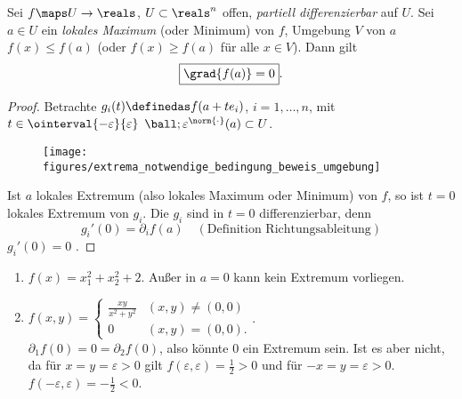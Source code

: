 \begin{satz}\label{extremum_notwendige_bedingung}
    Sei \( f\maps U\to \reals \), \( U\subset \reals^n \) offen, \emph{partiell differenzierbar} auf \( U \). Sei \( a\in U \) ein \emph{lokales Maximum} (oder Minimum) von \( f \), \dh  \texists Umgebung \( V \) von \( a \) \sd \( f(x)\leq f(a) \) (oder \( f(x)\geq f(a) \) für alle \( x\in V \)). Dann gilt
    \begin{equation*}
        \boxed{\grad{f(a)}=0}.
    \end{equation*} 
\end{satz}
\begin{proof}
    Betrachte \( g_i(t)\definedas f(a+t e_i) \), \( i=1,\dotsc, n \), mit \( t\in \ointerval{-\varepsilon}{\varepsilon} \) \sd \( \ball;{\varepsilon}^{\norm{\cdot}}(a)\subset U \).
    \begin{figure}[H]
        \centering
        \texttt{[image: figures/extrema\_notwendige\_bedingung\_beweis\_umgebung]}
        \label{fig:extrema_notwendige_bedingung_beweis_umgebung}
    \end{figure}
    Ist \( a \) lokales Extremum (also lokales Maximum oder Minimum) von \( f\), so ist \( t=0 \) lokales Extremum von \( g_i \). Die \( g_i \) sind in \( t=0 \) differenzierbar, denn
    \begin{equation*}
        g_i'(0)=\partial_i f(a)\quad (\text{Definition Richtungsableitung})
    \end{equation*}
     \timplies \( g_i'(0)=0 \) \timplies \Beh.
\end{proof}
\begin{beispiele*}
    \begin{enumerate}
        \item \( f(x)=x_1^2+x_2^2+2 \). Außer in \( a=0 \) kann kein Extremum vorliegen.
        \item \( f(x,y)=\begin{cases}
            \frac{xy}{x^2+y^2}&(x,y)\neq (0,0)\\
            0 &(x,y)=(0,0).
        \end{cases} \). \\\( \partial_1 f(0)=0=\partial_2 f(0) \), also könnte \( 0 \) ein Extremum sein. Ist es aber nicht, da für \( x=y=\varepsilon>0 \) gilt \( f(\varepsilon,\varepsilon)=\frac{1}{2}>0 \) und für \( -x=y=\varepsilon>0 \). \( f(-\varepsilon,\varepsilon)=-\frac{1}{2}<0 \).
    \end{enumerate}
\end{beispiele*}
